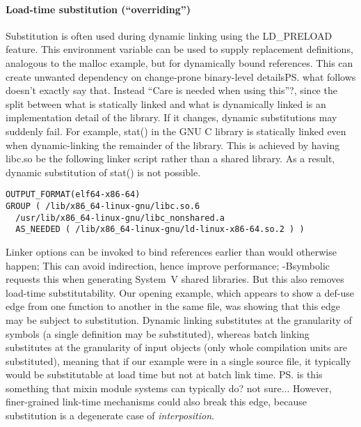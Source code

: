 \paragraph{Load-time substitution (``overriding'')}
Substitution is often used during dynamic linking using the \textsf{LD\_PRELOAD}
feature. This environment variable can be used to supply replacement
definitions, analogous to the \textsf{malloc} example, but for dynamically bound references.
This can create unwanted dependency on change-prone binary-level details\ps{what follows doesn't exactly say
  that. Instead ``Care is needed when using this''?}, 
since the split between what is statically linked and what is dynamically linked
is an implementation detail of the library.
If it changes, dynamic substitutions may suddenly fail.
For example, \textsf{stat()} in the GNU C library is statically linked even when
dynamic-linking the remainder of the library. This is achieved by having \textsf{libc.so} be the following linker script rather than a shared library.
As a result, dynamic substitution of \textsf{stat()} is not possible.

{\scriptsize\begin{lstlisting}[language=plain,basicstyle=\sffamily,columns=flexible]
OUTPUT_FORMAT(elf64-x86-64)
GROUP ( /lib/x86_64-linux-gnu/libc.so.6 
  /usr/lib/x86_64-linux-gnu/libc_nonshared.a
  AS_NEEDED ( /lib/x86_64-linux-gnu/ld-linux-x86-64.so.2 ) )
\end{lstlisting}}

Linker options can be invoked to bind references earlier than would otherwise happen;
This can avoid indirection, hence improve performance; \textsf{-Bsymbolic} 
requests this when generating System~V shared libraries.
But this also removes load-time substitutability.
Our opening example, which appears to show a def-use edge
from one function to another in the same file, 
was showing that this edge may be subject to substitution.
Dynamic linking substitutes at the granularity of symbols
(a single definition may be substituted),
whereas batch linking substitutes at the granularity of input objects
(only whole compilation units are substituted),
meaning that if our example were in a single source file, it typically
would be substitutable at load time but not at batch link time.
\ps{is this something that mixin module systems can typically do? not sure...}
However, finer-grained link-time mechanisms could 
also break this edge, because substitution is a degenerate case of \emph{interposition}.

